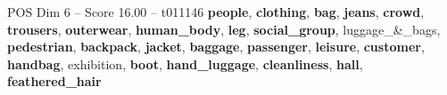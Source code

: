 \begin{textsample}{POS Dim 6 – Score 16.00 – t011146}  \label{ex:f6_pos_001}
\textbf{people}, \textbf{clothing}, \textbf{bag}, \textbf{jeans}, \textbf{crowd}, \textbf{trousers}, \textbf{outerwear}, \textbf{human\_body}, \textbf{leg}, \textbf{social\_group}, luggage\_\&\_bags, \textbf{pedestrian}, \textbf{backpack}, \textbf{jacket}, \textbf{baggage}, \textbf{passenger}, \textbf{leisure}, \textbf{customer}, \textbf{handbag}, exhibition, \textbf{boot}, \textbf{hand\_luggage}, \textbf{cleanliness}, \textbf{hall}, \textbf{feathered\_hair}

\end{textsample}
